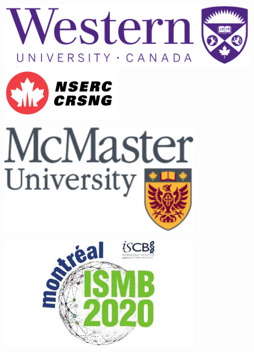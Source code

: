 \documentclass[a0,portrait]{a0poster}
\begin{document}
\begin{minipage}[m]{0.5\linewidth}
\begin{minipage}[m]{0.38\linewidth}
\includegraphics[width=13cm]{uwo_logo.jpg}
\hspace*{200pt}\includegraphics[width=6cm]{nserc_logo.jpg}
\end{minipage}
\begin{minipage}[m]{0.3\linewidth}
\includegraphics[width=10cm]{figures/mcmaster_logo2.jpg}
\end{minipage}
\begin{minipage}[m]{0.3\linewidth}
\includegraphics[width=10cm]{figures/ismb2020.jpg}
\end{minipage}
\end{minipage}

\vspace{1cm} %
\end{document}
